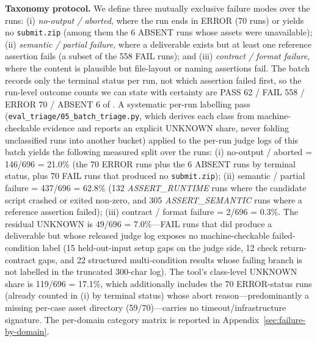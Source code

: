 \textbf{Taxonomy protocol.} We define three mutually exclusive failure modes over the \Neval{} runs: (i) \emph{no-output / aborted}, where the run ends in ERROR (70 runs) or yields no \texttt{submit.zip} (among them the 6 ABSENT runs whose assets were unavailable); (ii) \emph{semantic / partial failure}, where a deliverable exists but at least one reference assertion fails (a subset of the 558 FAIL runs); and (iii) \emph{contract / format failure}, where the content is plausible but file-layout or naming assertions fail. The batch records only the terminal status per run, not which assertion failed first, so the run-level outcome counts we can state with certainty are PASS 62 / FAIL 558 / ERROR 70 / ABSENT 6 of \Neval{}. A systematic per-run labelling pass (\texttt{eval\_triage/05\_batch\_triage.py}, which derives each class from machine-checkable evidence and reports an explicit UNKNOWN share, never folding unclassified runs into another bucket) applied to the per-run judge logs of this batch yields the following measured split over the \Neval{} runs: (i) no-output / aborted = 146/696 = 21.0\% (the 70 ERROR runs plus the 6 ABSENT runs by terminal status, plus 70 FAIL runs that produced no \texttt{submit.zip}); (ii) semantic / partial failure = 437/696 = 62.8\% (132 \emph{ASSERT\_RUNTIME} runs where the candidate script crashed or exited non-zero, and 305 \emph{ASSERT\_SEMANTIC} runs where a reference assertion failed); (iii) contract / format failure = 2/696 = 0.3\%. The residual UNKNOWN is 49/696 = 7.0\%---FAIL runs that did produce a deliverable but whose released judge log exposes no machine-checkable failed-condition label (15 held-out-input setup gaps on the judge side, 12 check return-contract gaps, and 22 structured multi-condition results whose failing branch is not labelled in the truncated 300-char log). The tool's class-level UNKNOWN share is 119/696 = 17.1\%, which additionally includes the 70 ERROR-status runs (already counted in (i) by terminal status) whose abort reason---predominantly a missing per-case asset directory (59/70)---carries no timeout/infrastructure signature. The per-domain category matrix is reported in Appendix~\ref{sec:failure-by-domain}.
